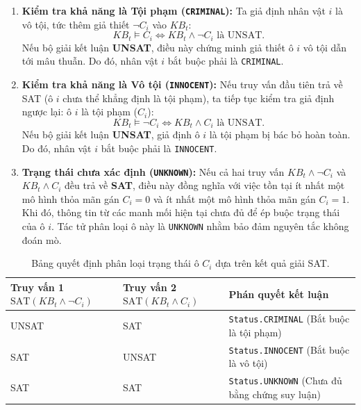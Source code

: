 \begin{enumerate}
    \item \textbf{Kiểm tra khả năng là Tội phạm (\texttt{CRIMINAL}):}
    Ta giả định nhân vật $i$ là vô tội, tức thêm giả thiết $\neg C_i$ vào $KB_t$:
    \begin{equation}
        KB_t \models C_i \iff KB_t \wedge \neg C_i \text{ là UNSAT}.
    \end{equation}
    Nếu bộ giải kết luận \textbf{UNSAT}, điều này chứng minh giả thiết ô $i$ vô tội dẫn tới mâu thuẫn. Do đó, nhân vật $i$ bắt buộc phải là \texttt{CRIMINAL}.

    \item \textbf{Kiểm tra khả năng là Vô tội (\texttt{INNOCENT}):}
    Nếu truy vấn đầu tiên trả về SAT (ô $i$ chưa thể khẳng định là tội phạm), ta tiếp tục kiểm tra giả định ngược lại: ô $i$ là tội phạm ($C_i$):
    \begin{equation}
        KB_t \models \neg C_i \iff KB_t \wedge C_i \text{ là UNSAT}.
    \end{equation}
    Nếu bộ giải kết luận \textbf{UNSAT}, giả định ô $i$ là tội phạm bị bác bỏ hoàn toàn. Do đó, nhân vật $i$ bắt buộc phải là \texttt{INNOCENT}.

    \item \textbf{Trạng thái chưa xác định (\texttt{UNKNOWN}):}
    Nếu cả hai truy vấn $KB_t \wedge \neg C_i$ và $KB_t \wedge C_i$ đều trả về \textbf{SAT}, điều này đồng nghĩa với việc tồn tại ít nhất một mô hình thỏa mãn gán $C_i = 0$ và ít nhất một mô hình thỏa mãn gán $C_i = 1$. Khi đó, thông tin từ các manh mối hiện tại chưa đủ để ép buộc trạng thái của ô $i$. Tác tử phân loại ô này là \texttt{UNKNOWN} nhằm bảo đảm nguyên tắc không đoán mò.
\end{enumerate}


\begin{table}[H]
    \centering
    \caption{Bảng quyết định phân loại trạng thái ô $C_i$ dựa trên kết quả giải SAT.}
    \label{tab:entailment_decision}
    \begin{tabularx}{\textwidth}{|>{\centering\arraybackslash}p{4.2cm}|>{\centering\arraybackslash}p{4.2cm}|X|}
        \hline
        \textbf{Truy vấn 1} \newline $\text{SAT}(KB_t \wedge \neg C_i)$ & \textbf{Truy vấn 2} \newline $\text{SAT}(KB_t \wedge C_i)$ & \textbf{Phán quyết kết luận} \\
        \hline
        UNSAT & SAT & \texttt{Status.CRIMINAL} \newline (Bắt buộc là tội phạm) \\
        \hline
        SAT & UNSAT & \texttt{Status.INNOCENT} \newline (Bắt buộc là vô tội) \\
        \hline
        SAT & SAT & \texttt{Status.UNKNOWN} \newline (Chưa đủ bằng chứng suy luận) \\
        \hline
    \end{tabularx}
\end{table}

